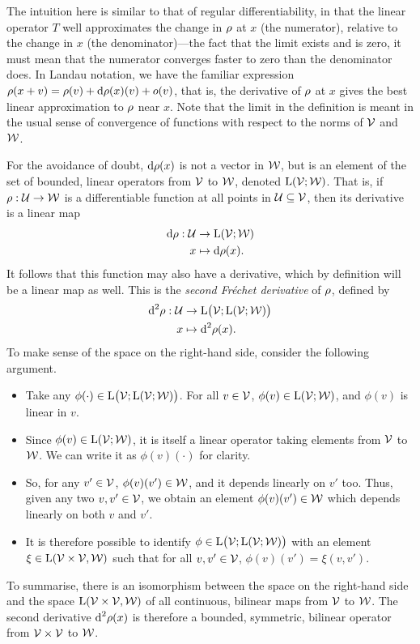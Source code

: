 \pagebreak
The intuition here is similar to that of regular differentiability, in that the linear operator $T$ well approximates the change in $\rho$ at $x$ (the numerator), relative to the change in $x$ (the denominator)---the fact that the limit exists and is zero, it must mean that the numerator converges faster to zero than the denominator does.
In Landau notation, we have the familiar expression $\rho(x+v) = \rho(v) + \text{d} \rho(x)(v) + o(v)$, that is, the derivative of $\rho$ at $x$ gives the best linear approximation to $\rho$ near $x$.
Note that the limit in the definition is meant in the usual sense of convergence of functions with respect to the norms of ${\mathcal V}$ and ${\mathcal W}$.

For the avoidance of doubt, $\text{d} \rho(x)$ is not a vector in ${\mathcal W}$, but is an element of the set of bounded, linear operators from ${\mathcal V}$ to ${\mathcal W}$, denoted $\text{L}({\mathcal V};{\mathcal W})$.
That is, if $\rho :{\mathcal U}\to{\mathcal W}$ is a differentiable function at all points in ${\mathcal U}\subseteq{\mathcal V}$, then its derivative is a linear map
\begin{align*}
  \text{d} \rho : {\mathcal U} &\to \text{L}({\mathcal V};{\mathcal W}) \\
  x &\mapsto \text{d} \rho(x).
\end{align*}
It follows that this function may also have a derivative, which by definition will be a linear map as well.
This is the \emph{second Fréchet derivative} of $\rho$, defined by
\begin{align*}
  \text{d}^2 \rho : {\mathcal U} &\to \text{L}\big({\mathcal V};\text{L}({\mathcal V};{\mathcal W})\big) \\
  x &\mapsto \text{d}^2\rho(x).
\end{align*}
To make sense of the space on the right-hand side, consider the following argument.
\begin{itemize}
  \item Take any $\phi(\cdot) \in \text{L}\big({\mathcal V};\text{L}({\mathcal V};{\mathcal W})\big)$. For all $v\in{\mathcal V}$, $\phi(v)\in\text{L}({\mathcal V};{\mathcal W})$, and $\phi(v)$ is linear in $v$.
  \item Since $\phi(v)\in\text{L}({\mathcal V};{\mathcal W})$, it is itself a linear operator taking elements from ${\mathcal V}$ to ${\mathcal W}$. We can write it as $\phi(v)(\cdot)$ for clarity.
  \item So, for any $v'\in{\mathcal V}$, $\phi(v)(v')\in{\mathcal W}$, and it depends linearly on $v'$ too. Thus, given any two $v,v'\in{\mathcal V}$, we obtain an element $\phi(v)(v')\in{\mathcal W}$ which depends linearly on both $v$ and $v'$.
  \item It is therefore possible to identify $\phi \in \text{L}\big({\mathcal V};\text{L}({\mathcal V};{\mathcal W})\big)$ with an element $\xi \in \text{L}({\mathcal V} \times {\mathcal V}, {\mathcal W})$ such that for all $v,v'\in{\mathcal V}$, $\phi(v)(v') = \xi(v,v')$.
\end{itemize}
To summarise, there is an isomorphism between the space on the right-hand side and the space $\text{L}({\mathcal V} \times {\mathcal V}, {\mathcal W})$ of all continuous, bilinear maps from ${\mathcal V}$ to ${\mathcal W}$.
The second derivative $\text{d}^2 \rho(x)$ is therefore a bounded, symmetric, bilinear operator from ${\mathcal V}\times{\mathcal V}$ to ${\mathcal W}$.

